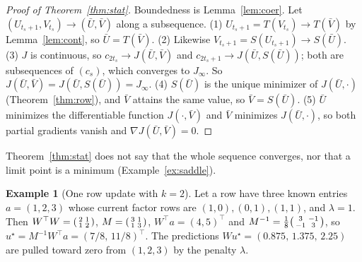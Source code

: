 \documentclass[10pt]{article}
\theoremstyle{plain}
\theoremstyle{definition}
\newtheorem{example}[theorem]{Example}
\theoremstyle{remark}
\newcommand{\T}{^{\top}}
\begin{document}
\begin{proof}[Proof of Theorem~\ref{thm:stat}]
Boundedness is Lemma~\ref{lem:coer}. Let $(U_{t_s+1},V_{t_s})\to(\bar U,\bar V)$ along a subsequence.
(1) $U_{t_s+1}=T(V_{t_s})\to T(\bar V)$ by Lemma~\ref{lem:cont}, so $\bar U=T(\bar V)$.
(2) Likewise $V_{t_s+1}=S(U_{t_s+1})\to S(\bar U)$.
(3) $J$ is continuous, so $c_{2t_s}\to J(\bar U,\bar V)$ and $c_{2t_s+1}\to J(\bar U,S(\bar U))$; both are subsequences of $(c_s)$, which converges to $J_\infty$. So $J(\bar U,\bar V)=J(\bar U,S(\bar U))=J_\infty$.
(4) $S(\bar U)$ is the unique minimizer of $J(\bar U,\cdot)$ (Theorem~\ref{thm:row}), and $\bar V$ attains the same value, so $\bar V=S(\bar U)$.
(5) $\bar U$ minimizes the differentiable function $J(\cdot,\bar V)$ and $\bar V$ minimizes $J(\bar U,\cdot)$, so both partial gradients vanish and $\nabla J(\bar U,\bar V)=0$.
\end{proof}

Theorem~\ref{thm:stat} does not say that the whole sequence converges, nor that a limit point is a minimum (Example~\ref{ex:saddle}).

\begin{example}[One row update with $k=2$]\label{ex:k2}
Let a row have three known entries $a=(1,2,3)$ whose current factor rows are $(1,0),(0,1),(1,1)$, and $\lambda=1$. Then $W\T W=\begin{psmallmatrix}2&1\\1&2\end{psmallmatrix}$, $M=\begin{psmallmatrix}3&1\\1&3\end{psmallmatrix}$, $W\T a=(4,5)\T$ and $M^{-1}=\tfrac18\begin{psmallmatrix}3&-1\\-1&3\end{psmallmatrix}$, so $u^\star=M^{-1}W\T a=(7/8,\,11/8)\T$. The predictions $Wu^\star=(0.875,\,1.375,\,2.25)$ are pulled toward zero from $(1,2,3)$ by the penalty $\lambda$.
\end{example}
\end{document}

